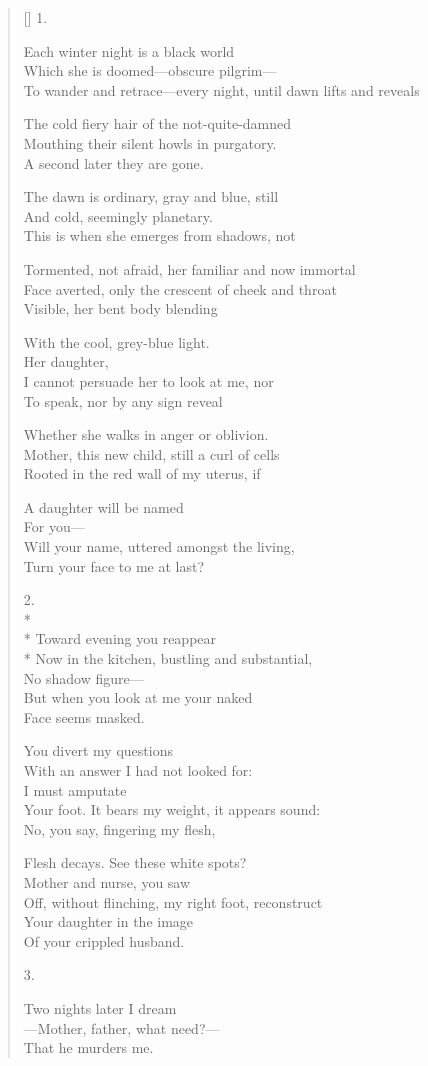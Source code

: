 \label{ch:threedreams}
\settowidth{\versewidth}{To wander and retrace---every night, until dawn lifts and reveals}
\begin{verse}[\versewidth]
1.

Each winter night is a black world\\
Which she is doomed---obscure pilgrim---\\
To wander and retrace---every night, until dawn lifts and reveals

The cold fiery hair of the not-quite-damned\\
Mouthing their silent howls in purgatory.\\
\qquad A second later they are gone.

The dawn is ordinary, gray and blue, still\\
And cold, seemingly planetary.\\
This is when she emerges from shadows, not 

Tormented, not afraid, her familiar and now immortal\\
Face averted, only the crescent of cheek and throat\\
Visible, her bent body blending

With the cool, grey-blue light.\\
\hfill Her daughter,\\
I cannot persuade her to look at me, nor\\
To speak, nor by any sign reveal

Whether she walks in anger or oblivion.\\
Mother, this new child, still a curl of cells\\
Rooted in the red wall of my uterus, if

A daughter will be named\\
For you---\\
\hfill Will your name, uttered amongst the living,\\
Turn your face to me at last?

2.\\*
~\\*
Toward evening you reappear\\*
Now in the kitchen, bustling and substantial,\\
No shadow figure---\\
But when you look at me your naked \\
Face seems masked.

You divert my questions\\
With an answer I had not looked for:\\
I must amputate \\
Your foot. It bears my weight, it appears sound:\\
No, you say, fingering my flesh,

Flesh decays. See these white spots?\\
Mother and nurse, you saw\\
Off, without flinching, my right foot, reconstruct\\
Your daughter in the image\\
Of your crippled husband.

3.

Two nights later I dream\\
---Mother, father, what need?---\\
That he murders me.
\end{verse}
